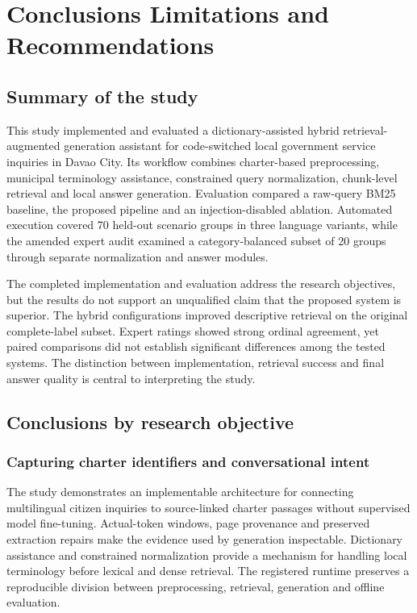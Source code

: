 \chapter{Conclusions Limitations and Recommendations}

\section{Summary of the study}

This study implemented and evaluated a dictionary-assisted hybrid retrieval-augmented generation assistant for code-switched local government service inquiries in Davao City. Its workflow combines charter-based preprocessing, municipal terminology assistance, constrained query normalization, chunk-level retrieval and local answer generation. Evaluation compared a raw-query BM25 baseline, the proposed pipeline and an injection-disabled ablation. Automated execution covered 70 held-out scenario groups in three language variants, while the amended expert audit examined a category-balanced subset of 20 groups through separate normalization and answer modules.


The completed implementation and evaluation address the research objectives, but the results do not support an unqualified claim that the proposed system is superior. The hybrid configurations improved descriptive retrieval on the original complete-label subset. Expert ratings showed strong ordinal agreement, yet paired comparisons did not establish significant differences among the tested systems. The distinction between implementation, retrieval success and final answer quality is central to interpreting the study.


\section{Conclusions by research objective}

\subsection{Capturing charter identifiers and conversational intent}

The study demonstrates an implementable architecture for connecting multilingual citizen inquiries to source-linked charter passages without supervised model fine-tuning. Actual-token windows, page provenance and preserved extraction repairs make the evidence used by generation inspectable. Dictionary assistance and constrained normalization provide a mechanism for handling local terminology before lexical and dense retrieval. The registered runtime preserves a reproducible division between preprocessing, retrieval, generation and offline evaluation.


